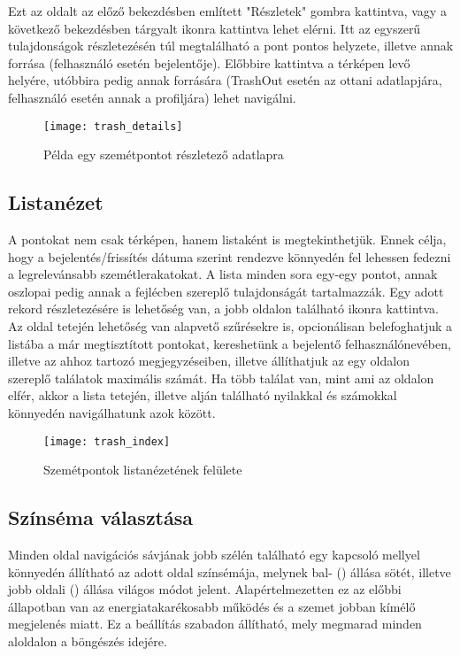 Ezt az oldalt az előző bekezdésben említett "Részletek" gombra kattintva, vagy a következő bekezdésben tárgyalt  ikonra kattintva lehet elérni. Itt az egyszerű tulajdonságok részletezésén túl megtalálható a pont pontos helyzete, illetve annak forrása (felhasználó esetén bejelentője). Előbbire kattintva a térképen levő helyére, utóbbira pedig annak forrására (TrashOut esetén az ottani adatlapjára, felhasználó esetén annak a profiljára) lehet navigálni.

\begin{figure}[H]
	\centering
	\texttt{[image: trash\_details]}
	\caption{Példa egy szemétpontot részletező adatlapra}
	\label{fig:trash_details}
\end{figure}

\subsection{Listanézet}

A pontokat nem csak térképen, hanem listaként is megtekinthetjük. Ennek célja, hogy a bejelentés/frissítés dátuma szerint rendezve könnyedén fel lehessen fedezni a legrelevánsabb szemétlerakatokat. A lista minden sora egy-egy pontot, annak oszlopai pedig annak a fejlécben szereplő tulajdonságát tartalmazzák. Egy adott rekord részletezésére is lehetőség van, a jobb oldalon található  ikonra kattintva. Az oldal tetején lehetőség van alapvető szűrésekre is, opcionálisan belefoghatjuk a listába a már megtisztított pontokat, kereshetünk a bejelentő felhasználónevében, illetve az ahhoz tartozó megjegyzéseiben, illetve állíthatjuk az egy oldalon szereplő találatok maximális számát. Ha több találat van, mint ami az oldalon elfér, akkor a lista tetején, illetve alján található nyilakkal és számokkal könnyedén navigálhatunk azok között.

\begin{figure}[H]
	\centering
	\texttt{[image: trash\_index]}
	\caption{Szemétpontok listanézetének felülete}
	\label{fig:trash_index}
\end{figure}


\subsection{Színséma választása}

Minden oldal navigációs sávjának jobb szélén található egy kapcsoló mellyel könnyedén állítható az adott oldal színsémája, melynek bal- () állása sötét, illetve jobb oldali () állása világos módot jelent. Alapértelmezetten ez az előbbi állapotban van az energiatakarékosabb működés és a szemet jobban kímélő megjelenés miatt. Ez a beállítás szabadon állítható, mely megmarad minden aloldalon a böngészés idejére.


